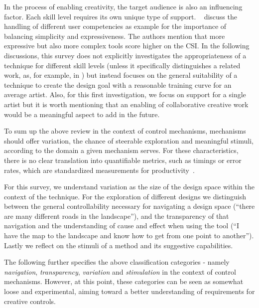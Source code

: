 In the process of enabling creativity, the target audience is also an influencing factor. Each skill level requires its own unique type of support. \citeauthor*{cherry_2014_qcs}~\cite{cherry_2014_qcs} discuss the handling of different user competencies as example for the importance of balancing simplicity and expressiveness. The authors mention that more expressive but also more complex tools score higher on the CSI. In the following discussions, this survey does not explicitly investigates the appropriateness of a technique for different skill levels (unless it specifically distinguishes a related work, as, for example, in \cite{benedetti_2014_pba}) but instead focuses on the general suitability of a technique to create the design goal with a reasonable training curve for an average artist. Also, for this first investigation, we focus on support for a single artist but it is worth mentioning that an enabling of collaborative creative work would be a meaningful aspect to add in the future.


To sum up the above review in the context of control mechanisms, mechanisms should offer variation, the chance of steerable exploration and meaningful stimuli, according to the domain a given mechanism serves. For these characteristics, there is no clear translation into quantifiable metrics, such as timings or error rates, which are standardized measurements for productivity~\cite{cherry_2014_qcs,shneiderman_2007_cst}.

For this survey, we understand variation as the size of the design space within the context of the technique. For the exploration of different designs we distinguish between the general controllability necessary for navigating a design space (``there are many different roads in the landscape''), and the transparency of that navigation and the understanding of cause and effect when using the tool (``I have the map to the landscape and know how to get from one point to another''). Lastly we reflect on the stimuli of a method and its suggestive capabilities. 

The following further specifies the above classification categories - namely \textit{navigation}, \textit{transparency}, \textit{variation} and \textit{stimulation} in the context of control mechanisms. However, at this point, these categories can be seen as somewhat loose and experimental, aiming toward a better understanding of requirements for creative controls.

